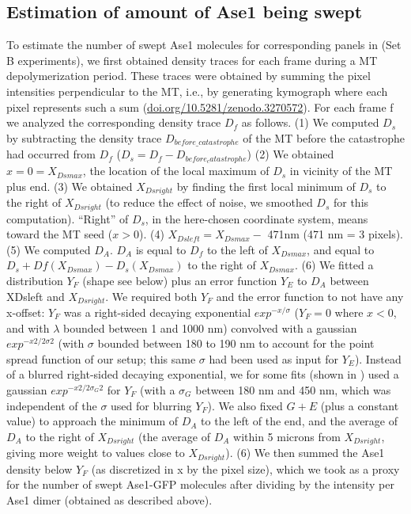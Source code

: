 \subsection{Estimation of amount of Ase1 being swept}
To estimate the number of swept Ase1 molecules for corresponding panels in  (Set B experiments), we first obtained density traces for each frame during a MT depolymerization period. These traces were obtained by summing the pixel intensities perpendicular to the MT, i.e., by generating kymograph where each pixel represents such a sum (\url{doi.org/10.5281/zenodo.3270572}). For each frame f we analyzed the corresponding density trace $D_f$ as follows. (1) We computed $D_s$ by subtracting the density trace $D_{before\_catastrophe}$ of the MT before the catastrophe had occurred from $D_f$ ($D_s = D_f - D_{before_catastrophe}$) (2) We obtained $x = 0 = X_{Dsmax}$, the location of the local maximum of $D_s$ in vicinity of the MT plus end. (3) We obtained $X_{Dsright}$ by finding the first local minimum of $D_s$ to the right of $X_{Dsright}$ (to reduce the effect of noise, we smoothed $D_s$ for this computation). “Right” of $D_s$, in the here-chosen coordinate system, means toward the MT seed ($x > 0$). (4) $X_{Dsleft} = X_{Dsmax} -$ 471nm (471 nm = 3 pixels). (5) We computed $D_A$. $D_A$ is equal to $D_f$ to the left of $X_{Dsmax}$, and equal to $D_s + Df(X_{Dsmax}) - D_s(X_{Dsmax})$ to the right of $X_{Dsmax}$. (6) We fitted a distribution $Y_F$ (shape see below) plus an error function $Y_E$ to $D_A$ between XDsleft and $X_{Dsright}$. We required both $Y_F$ and the error function to not have any x-offset: $Y_F$ was a right-sided decaying exponential $exp^{-x/\sigma}$ ($Y_F = 0$ where $x < 0$, and with $\lambda$ bounded between 1 and 1000 nm) convolved with a gaussian $exp^{-x2/2\sigma2}$ (with $\sigma$ bounded between 180 to 190 nm to account for the point spread function of our setup; this same $\sigma$ had been used as input for $Y_E$). Instead of a blurred right-sided decaying exponential, we for some fits (shown in ) used a gaussian $exp^{-x2/2\sigma_G2}$ for $Y_F$ (with a $\sigma_G$ between 180 nm and 450 nm, which was independent of the $\sigma$ used for blurring $Y_F$). We also fixed $G+E$ (plus a constant value) to approach the minimum of $D_A$ to the left of the end, and the average of $D_A$ to the right of $X_{Dsright}$ (the average of $D_A$ within 5 microns from $X_{Dsright}$, giving more weight to values close to $X_{Dsright}$). (6) We then summed the Ase1 density below $Y_F$ (as discretized in x by the pixel size), which we took as a proxy for the number of swept Ase1-GFP molecules after dividing by the intensity per Ase1 dimer (obtained as described above). 

